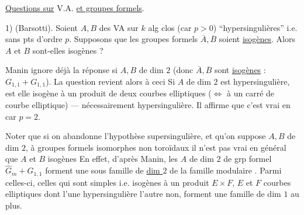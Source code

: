 
\uline{Questions sur} V.A. \uline{et groupes formels}.

1) (Barsotti). Soient $A,B$ des VA sur $k$ alg clos (car $p>0$) ``hypersingulières'' i.e. sans pts d'ordre $p$. Supposons que les groupes formels $\overline A,\overline B$ soient \uline{isogènes}. Alors $A$ et $B$ sont-elles isogènes ?


Manin ignore déjà la réponse si $A,B$ de dim $2$ (donc $\overline A,\overline B$ sont \uline{isogènes} : $G_{1,1}+G_{1,1}$). La question revient alors à ceci Si $A$ de dim $2$ est hypersingulière, est elle isogène à un produit de deux courbes elliptiques ($\Leftrightarrow$ à un carré de courbe elliptique) --- nécessairement hypersingulière. Il affirme que c'est vrai en car $p=2$.

Noter que si on abandonne l'hypothèse supersingulière, et qu'on suppose $A,B$  de dim $2$, à groupes formels isomorphes non toroïdaux il n'est pas vrai en général que $A$ et $B$ isogènes  En effet, d'après Manin, les  $A$ de dim $2$  de grp formel $\widehat G_m+G_{1,1}$ forment une sous famille   de \uline{dim $2$} de la famille modulaire . Parmi celles-ci, celles qui sont   simples i.e.  isogènes à un produit $E\times F$, $E$ et $F$ courbes elliptiques dont l'une  hypersingulière l'autre non, forment une famille de dim $1$ au plus. \margin{[ \uline{NB.} il n'y a pas de famille \unsure{continue}}

